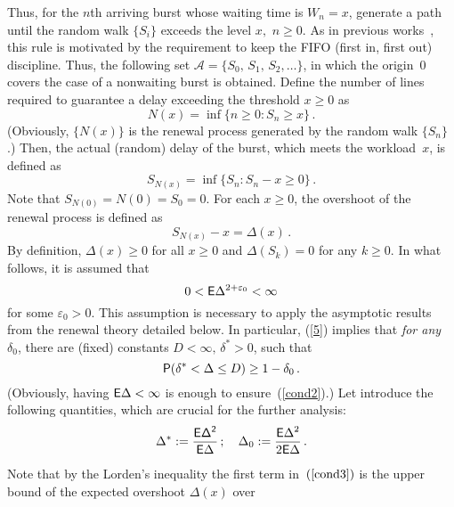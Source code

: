 \begin{multicols}{2}
Thus, for the $n$th  arriving  burst whose waiting time is $W_n=x$,
generate a path until the random walk $\{S_i\}$ exceeds the level
$x,\,\,n\ge 0$. As in previous works~\cite{optical1, optical2}, this
rule  is motivated by the requirement to keep the \mbox{FIFO} (first in, first out)
discipline. Thus,
 the following  set
 $\mathcal{A} = \{S_0,\, S_1,\,S_2,
\ldots\}$, in which  the  origin~$0$  covers  the case of a
nonwaiting burst is obtained. Define the  number of lines required to
guarantee a delay exceeding the threshold $x\ge 0$ as
\begin{equation*}
N(x) = \inf \{n\ge 0: S_n \ge x\}\,.
\end{equation*}
(Obviously, $\{N(x)\}$  is the renewal process generated by the random
walk $\{S_n\}$.) Then, the actual (random)  delay of the  burst, which
meets the workload~$x$, is defined as
\begin{equation*}
\label{act_del} S_{N(x)}=\inf\{S_n: S_n-x\ge 0\}\,.
\end{equation*}
Note that $S_{N(0)}=N(0)=S_0=0$. For each $x\ge0$, the
overshoot of the renewal process is defined as
\begin{equation}
\label{eq:ceilx}
S_{N(x)}-x=\Delta(x)\,.
\end{equation}
By definition,  $\Delta(x)\ge0$ for all $x\geq0$ and
$\Delta(S_{k})=0$
 for any $k\ge0$.   In what
follows, it is assumed that
\begin{equation}
0<{\sf E} \Delta^{2+\varepsilon_0} < \infty \label{5}
\end{equation}
for some $\varepsilon_0>0$. This assumption is necessary to  apply the
asymptotic results from the renewal theory detailed below. In
particular, (\ref{5})  implies that {\it for any~$\delta_0$}, there
are (fixed) constants $D<\infty,\,\delta^*>0$, such that
\begin{equation}
 {\sf P}( \delta^* < \Delta \le D )\ge 1- \delta_0\,.
\label{cond2}
\end{equation}
(Obviously, having ${\sf E}\Delta<\infty$ is enough to ensure~(\ref{cond2}).)
Let introduce the following quantities,  which  are crucial for the
 further analysis:
\begin{equation}
\label{cond3} \Delta^* := \displaystyle\frac{\displaystyle \sf E \Delta^2\mathstrut}{\displaystyle {\sf E} \Delta\mathstrut}\,;\quad
\Delta_0 := \displaystyle\frac{\displaystyle {\sf E} \Delta^2\mathstrut}{\displaystyle 2{\sf E} \Delta\mathstrut}\,.
\end{equation}
Note that by the  Lorden's inequality \cite{Asmus} the first term in~$(\ref{cond3})$ 
is  the upper bound of the expected overshoot $\Delta(x)$ over 

\end{multicols}
